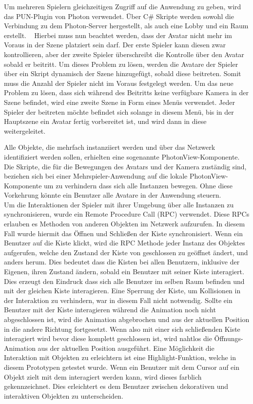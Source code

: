 Um mehreren Spielern gleichzeitigen Zugriff auf die Anwendung zu geben, wird das PUN-Plugin von Photon verwendet. Über C\# Skripte werden sowohl die Verbindung zu dem Photon-Server hergestellt, als auch eine Lobby und ein Raum erstellt. ~\parencite{InfoGamer2018}
Hierbei muss nun beachtet werden, dass der Avatar nicht mehr im Voraus in der Szene platziert sein darf. Der erste Spieler kann diesen zwar kontrollieren, aber der zweite Spieler überschreibt die Kontrolle über den Avatar sobald er beitritt. Um dieses Problem zu lösen, werden die Avatare der Spieler über ein Skript dynamisch der Szene hinzugefügt, sobald diese beitreten. Somit muss die Anzahl der Spieler nicht im Voraus festgelegt werden. Um das neue Problem zu lösen, dass sich während des Beitritts keine verfügbare Kamera in der Szene befindet, wird eine zweite Szene in Form eines Menüs verwendet. Jeder Spieler der beitreten möchte befindet sich solange in diesem Menü, bis in der Hauptszene ein Avatar fertig vorbereitet ist, und wird dann in diese weitergeleitet. \newline

Alle Objekte, die mehrfach instanziiert werden und über das Netzwerk identifiziert werden sollen, erhielten eine sogenannte PhotonView-Komponente. Die Skripte, die für die Bewegungen des Avatars und der Kamera zuständig sind, beziehen sich bei einer Mehrspieler-Anwendung auf die lokale PhotonView-Komponente um zu verhindern dass sich alle Instanzen bewegen. Ohne diese Vorkehrung könnte ein Benutzer alle Avatare in der Anwendung steuern. \\

Um die Interaktionen der Spieler mit ihrer Umgebung über alle Instanzen zu synchronisieren, wurde ein Remote Procedure Call (RPC) verwendet. Diese RPCs erlauben es Methoden von anderen Objekten im Netzwerk aufzurufen. In diesem Fall wurde hiermit das Öffnen und Schließen der Kiste synchronisiert. Wenn ein Benutzer auf die Kiste klickt, wird die RPC Methode jeder Instanz des Objektes aufgerufen, welche den Zustand der Kiste von geschlossen zu geöffnet ändert, und anders herum. Dies bedeutet dass die Kisten bei allen Benutzern, inklusive der Eigenen, ihren Zustand ändern, sobald ein Benutzer mit seiner Kiste interagiert. Dies erzeugt den Eindruck dass sich alle Benutzer im selben Raum befinden und mit der gleichen Kiste interagieren. Eine Sperrung der Kiste, um Kollisionen in der Interaktion zu verhindern, war in diesem Fall nicht notwendig. Sollte ein Benutzer mit der Kiste interagieren während die Animation noch nicht abgeschlossen ist, wird die Animation abgebrochen und aus der aktuellen Position in die andere Richtung fortgesetzt. Wenn also mit einer sich schließenden Kiste interagiert wird bevor diese komplett geschlossen ist, wird nahtlos die Öffnungs-Animation aus der aktuellen Position ausgeführt. \newline 
Eine Möglichkeit die Interaktion mit Objekten zu erleichtern ist eine Highlight-Funktion, welche in diesem Prototypen getestet wurde. Wenn ein Benutzer mit dem Cursor auf ein Objekt zielt mit dem interagiert werden kann, wird dieses farblich gekennzeichnet. Dies erleichtert es dem Benutzer zwischen dekorativen und interaktiven Objekten zu unterscheiden.

